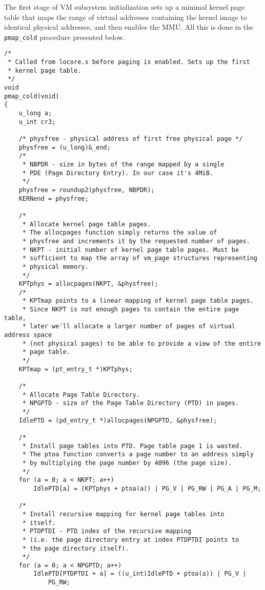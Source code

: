 \documentclass[shortabstract, english]{iithesis}
\newenvironment{code}{}{}
\begin{document}
The first stage of VM subsystem initialization sets up a minimal kernel page
table that maps the range of virtual addresses containing the kernel image to
identical physical addresses, and then enables the MMU. All this is done in the
\texttt{pmap_cold} procedure presented below.

\begin{code}
\begin{verbatim}
/*
 * Called from locore.s before paging is enabled. Sets up the first
 * kernel page table.
 */
void
pmap_cold(void)
{
    u_long a;
    u_int cr3;

    /* physfree - physical address of first free physical page */
    physfree = (u_long)&_end;
    /*
     * NBPDR - size in bytes of the range mapped by a single
     * PDE (Page Directory Entry). In our case it's 4MiB.
     */
    physfree = roundup2(physfree, NBPDR);
    KERNend = physfree;

    /*
     * Allocate kernel page table pages.
     * The allocpages function simply returns the value of
     * physfree and increments it by the requested number of pages.
     * NKPT - initial number of kernel page table pages. Must be
     * sufficient to map the array of vm_page structures representing
     * physical memory.
     */
    KPTphys = allocpages(NKPT, &physfree);
    /*
     * KPTmap points to a linear mapping of kernel page table pages.
     * Since NKPT is not enough pages to contain the entire page table,
     * later we'll allocate a larger number of pages of virtual address space
     * (not physical pages) to be able to provide a view of the entire
     * page table.
     */
    KPTmap = (pt_entry_t *)KPTphys;

    /*
     * Allocate Page Table Directory.
     * NPGPTD - size of the Page Table Directory (PTD) in pages.
     */
    IdlePTD = (pd_entry_t *)allocpages(NPGPTD, &physfree);

    /*
     * Install page tables into PTD. Page table page 1 is wasted.
     * The ptoa function converts a page number to an address simply
     * by multiplying the page number by 4096 (the page size).
     */
    for (a = 0; a < NKPT; a++)
        IdlePTD[a] = (KPTphys + ptoa(a)) | PG_V | PG_RW | PG_A | PG_M;

    /*
     * Install recursive mapping for kernel page tables into
     * itself.
     * PTDPTDI - PTD index of the recursive mapping
     * (i.e. the page directory entry at index PTDPTDI points to
     * the page directory itself).
     */
    for (a = 0; a < NPGPTD; a++)
        IdlePTD[PTDPTDI + a] = ((u_int)IdlePTD + ptoa(a)) | PG_V |
            PG_RW;


\end{verbatim}
\end{code}
\end{document}
